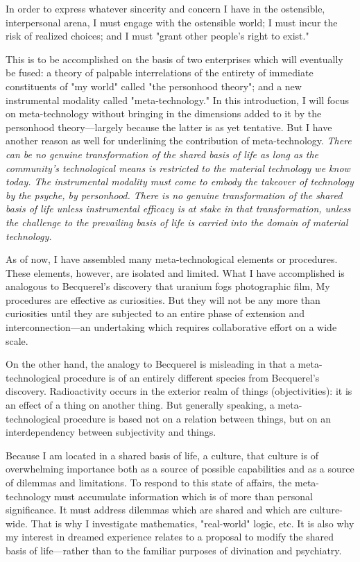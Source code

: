 In order to express whatever sincerity and concern I have in the ostensible, 
interpersonal arena, I must engage with the ostensible world; I must incur the risk 
of realized choices; and I must "grant other people's right to exist." 

\visbreak

This is to be accomplished on the basis of two enterprises which will eventually be 
fused: a theory of palpable interrelations of the entirety of immediate constituents 
of "my world" called "the personhood theory"; and a new instrumental modality 
called "meta-technology." In this introduction, I will focus on meta-technology 
without bringing in the dimensions added to it by the personhood theory---largely 
because the latter is as yet tentative. But I have another reason as well for 
underlining the contribution of meta-technology. \textit{There can be no genuine transformation 
of the shared basis of life as long as the community's technological means is restricted to the 
material technology we know today. The instrumental modality must come to embody the 
takeover of technology by the psyche, by personhood. There is no genuine transformation 
of the shared basis of life unless instrumental efficacy is at stake in that transformation, 
unless the challenge to the prevailing basis of life is carried into the domain of material 
technology.}

As of now, I have assembled many meta-technological elements or procedures. 
These elements, however, are isolated and limited. What I have accomplished is 
analogous to Becquerel's discovery that uranium fogs photographic film, My 
procedures are effective as curiosities. But they will not be any more than curiosities 
until they are subjected to an entire phase of extension and interconnection---an 
undertaking which requires collaborative effort on a wide scale. 

On the other hand, the analogy to Becquerel is misleading in that a meta-technological 
procedure is of an entirely different species from Becquerel's discovery. 
Radioactivity occurs in the exterior realm of things (objectivities): it is an 
effect of a thing on another thing. But generally speaking, a meta-technological 
procedure is based not on a relation between things, but on an interdependency 
between subjectivity and things. 

Because I am located in a shared basis of life, a culture, that culture is of 
overwhelming importance both as a source of possible capabilities and as a source 
of dilemmas and limitations. To respond to this state of affairs, the meta-technology 
must accumulate information which is of more than personal significance. It must 
address dilemmas which are shared and which are culture-wide. That is why I 
investigate mathematics, "real-world" logic, etc. It is also why my interest in 
dreamed experience relates to a proposal to modify the shared basis of life---rather 
than to the familiar purposes of divination and psychiatry. 

